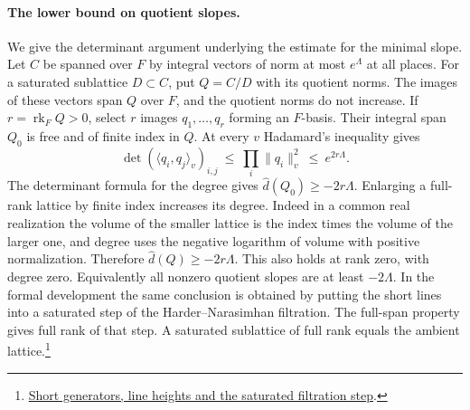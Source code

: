 \paragraph{The lower bound on quotient slopes.}
We give the determinant argument underlying the estimate for the
minimal slope. Let \(C\) be spanned over \(F\) by integral vectors of
norm at most \(e^\Lambda\) at all places. For a saturated sublattice
\(D\subset C\), put \(Q=C/D\) with its quotient norms. The images of
these vectors span \(Q\) over \(F\), and the quotient norms do not
increase. If \(r=\operatorname{rk}_F Q>0\), select \(r\) images
\(q_1,\ldots,q_r\) forming an \(F\)-basis. Their integral span
\(Q_0\) is free and of finite index in \(Q\). At every \(v\) Hadamard's
inequality gives
\[
  \det(\langle q_i,q_j\rangle_v)_{i,j}
        \ \le\ \prod_i\|q_i\|_v^2 \ \le\ e^{2r\Lambda}.
\]
The determinant formula for the degree gives
\(\widehat d(Q_0)\ge-2r\Lambda\). Enlarging a full-rank lattice
by finite index increases its degree. Indeed in a common real
realization the volume of the smaller lattice is the index times
the volume of the larger one, and degree uses the negative logarithm
of volume with positive normalization. Therefore
\(\widehat d(Q)\ge-2r\Lambda\). This also holds at rank zero, with
degree zero. Equivalently all nonzero quotient slopes are at least
\(-2\Lambda\). In the formal development the same conclusion is
obtained by putting the short lines into a saturated step of the
Harder--Narasimhan filtration. The full-span property gives full rank
of that step. A saturated sublattice of full rank equals the ambient
lattice.\footnote{\href{https://github.com/Deicyde/riemann-hypothesis/blob/40e56bab/src/Formalism/MeanHeightDescent/AverageDegreeBounds/SpanMuMin.lean}{Short generators, line heights and the saturated filtration step}.}

